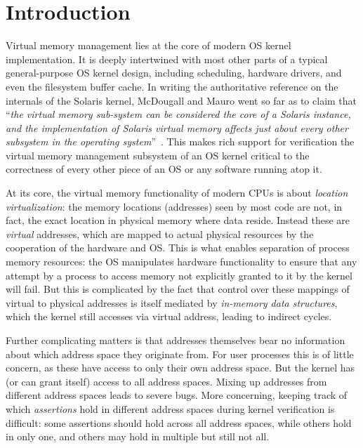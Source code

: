 \documentclass[acmsmall,screen,nonacm]{acmart}
\begin{document}
%
%
%
%
%
%
%
%
%
%
%
%
%
%
%
%
%
%
%
%
%
%
%
%
%
%
%
%

%
%
%
%

%
%
%
%

\maketitle

{
\theoremstyle{acmdefinition}
\newtheorem{assumption}[theorem]{Assumption}
}

%
\section{Introduction}
\label{sec:intro}
Virtual memory management lies at the core of modern OS kernel implementation. It is deeply intertwined with most other parts of a typical general-purpose OS kernel design, including scheduling, hardware drivers, and even the filesystem buffer cache. In writing the authoritative reference on the internals of the Solaris kernel, McDougall and Mauro went so far as to claim that ``\emph{the virtual memory sub-system can be considered the core of a Solaris instance, and the implementation of Solaris virtual memory affects just about every other subsystem in the operating system}''~\cite{mcdougall2006solaris}.
This makes rich support for verification the virtual memory management subsystem of an OS kernel critical to the correctness of every other piece of an OS or any software running atop it.

At its core, the virtual memory functionality of modern CPUs is about \emph{location virtualization}: the memory locations
(addresses) seen by most code are not, in fact, the exact location in physical memory where data reside. Instead these 
are \emph{virtual} addresses, which are mapped to actual physical resources by the cooperation of the hardware and OS. 
This is what enables separation of process memory resources:
the OS manipulates hardware functionality to ensure that any attempt by a process to access memory not explicitly granted 
to it by the kernel will fail. But this is complicated by the fact that 
%
%
control over these mappings of virtual to physical addresses is itself mediated by \emph{in-memory data structures}, 
which the kernel still accesses via virtual address, leading to indirect cycles.

Further complicating matters is that addresses themselves bear no information about which address space they originate 
from. For user processes this is of little concern, as these have access to only their own address space. But the kernel has
(or can grant itself) access to all address spaces. Mixing up addresses from different address spaces leads to severe bugs.
More concerning, keeping track of which \emph{assertions} hold in different address spaces during kernel verification is 
difficult: some assertions should hold across all address spaces, while others hold in only one, and others may hold in 
multiple but still not all.
\end{document}
